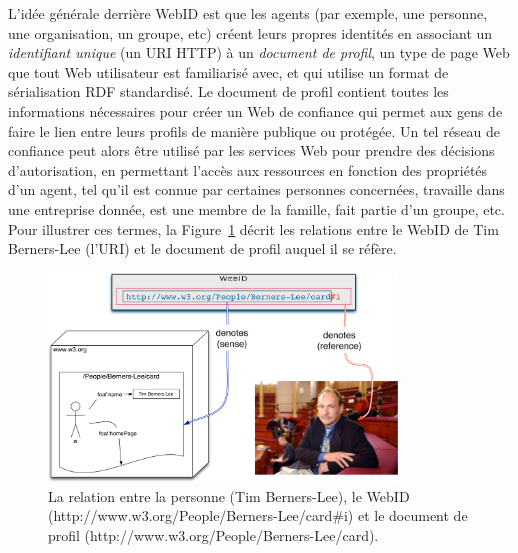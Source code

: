 L'idée générale derrière WebID est que les agents (par exemple, une personne, une organisation, un groupe, etc) créent leurs propres identités en associant un \textit{identifiant unique} (un URI HTTP) à un \textit{document de profil}, un type de page Web que tout Web utilisateur est familiarisé avec, et qui utilise un format de sérialisation RDF standardisé. Le document de profil contient toutes les informations nécessaires pour créer un Web de confiance qui permet aux gens de faire le lien entre leurs profils de manière publique ou protégée. Un tel réseau de confiance peut alors être utilisé par les services Web pour prendre des décisions d'autorisation, en permettant l'accès aux ressources en fonction des propriétés d'un agent, tel qu'il est connue par certaines personnes concernées, travaille dans une entreprise donnée, est une membre de la famille, fait partie d'un groupe, etc.\\

Pour illustrer ces termes, la Figure~\ref{fig:webid_fr} décrit les relations entre le WebID de Tim Berners-Lee (l'URI) et le document de profil auquel il se réfère.

\begin{figure}[h]
  \begin{center}
    \includegraphics[width=350px]{img/WebID-overview.png}
        \caption{La relation entre la personne (Tim Berners-Lee), le WebID (http://www.w3.org/People/Berners-Lee/card\#i) et le document de profil (http://www.w3.org/People/Berners-Lee/card).}
        \label{fig:webid_fr}
  \end{center}
\end{figure}


